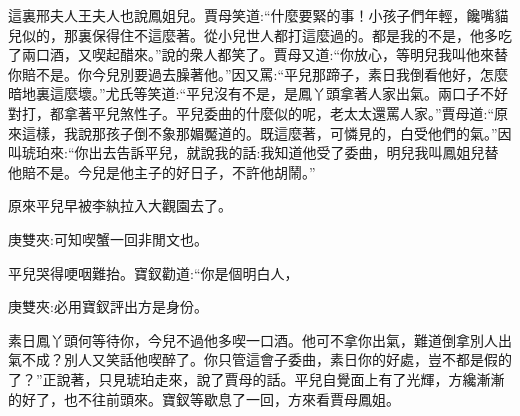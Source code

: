 \begin{parag}
    這裏邢夫人王夫人也說鳳姐兒。賈母笑道:“什麼要緊的事！小孩子們年輕，饞嘴貓兒似的，那裏保得住不這麼著。從小兒世人都打這麼過的。都是我的不是，他多吃了兩口酒，又喫起醋來。”說的衆人都笑了。賈母又道:“你放心，等明兒我叫他來替你賠不是。你今兒別要過去臊著他。”因又罵:“平兒那蹄子，素日我倒看他好，怎麼暗地裏這麼壞。”尤氏等笑道:“平兒沒有不是，是鳳丫頭拿著人家出氣。兩口子不好對打，都拿著平兒煞性子。平兒委曲的什麼似的呢，老太太還罵人家。”賈母道:“原來這樣，我說那孩子倒不象那媚魘道的。既這麼著，可憐見的，白受他們的氣。”因叫琥珀來:“你出去告訴平兒，就說我的話:我知道他受了委曲，明兒我叫鳳姐兒替他賠不是。今兒是他主子的好日子，不許他胡鬧。”
\end{parag}


\begin{parag}
    原來平兒早被李紈拉入大觀園去了。\begin{note}庚雙夾:可知喫蟹一回非閒文也。\end{note}平兒哭得哽咽難抬。寶釵勸道:“你是個明白人，\begin{note}庚雙夾:必用寶釵評出方是身份。\end{note}素日鳳丫頭何等待你，今兒不過他多喫一口酒。他可不拿你出氣，難道倒拿別人出氣不成？別人又笑話他喫醉了。你只管這會子委曲，素日你的好處，豈不都是假的了？”正說著，只見琥珀走來，說了賈母的話。平兒自覺面上有了光輝，方纔漸漸的好了，也不往前頭來。寶釵等歇息了一回，方來看賈母鳳姐。
\end{parag}


